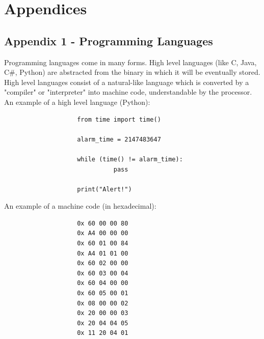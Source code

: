 \documentclass{report}
\begin{document}

	
	


\chapter*{Appendices}
\setcounter{page}{1}
\setcounter{section}{1}
\section{Appendix 1 -  Programming Languages}
Programming languages come in many forms. High level languages (like C, Java, C\#, Python) are abstracted from the binary in which it will be eventually stored. High level languages consist of a natural-like language which is converted by a "compiler" or "interpreter" into machine code, understandable by the processor.\newline \newline  \noindent
\noindent
An example of a high level language (Python):
\begin{verbatim}
                    from time import time()

                    alarm_time = 2147483647

                    while (time() != alarm_time):
                              pass

                    print("Alert!")
\end{verbatim}
An example of a machine code (in hexadecimal)\cite{proglangmachex}:
\begin{verbatim}
                    0x 60 00 00 80
                    0x A4 00 00 00
                    0x 60 01 00 84
                    0x A4 01 01 00
                    0x 60 02 00 00
                    0x 60 03 00 04
                    0x 60 04 00 00
                    0x 60 05 00 01
                    0x 08 00 00 02
                    0x 20 00 00 03
                    0x 20 04 04 05
                    0x 11 20 04 01
\end{verbatim}
\end{document}
